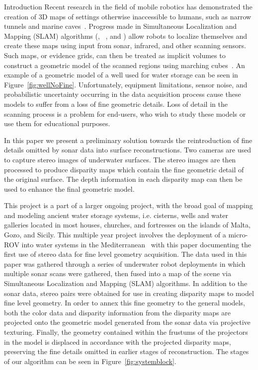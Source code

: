 \documentclass[twocolumn]{article}
\makeatletter
\def\section{\@startsection{section}{1}{\z@}{24pt plus 2 pt
minus 2 pt} {12pt plus 2pt minus 2pt}{\large\bf}}
\makeatother
\begin{document}
\section{Introduction}
Recent research in the field of mobile robotics has demonstrated the creation of 3D maps of settings otherwise inaccessible to humans, such as narrow tunnels and marine caves~\cite{ICEX11,McVicker,McVicker2}. Progress made in Simultaneous Localization and Mapping (SLAM) algorithms  (\cite{Williams2000}, ~\cite{harbor}, and \cite{Fairfield2005,Fairfield2006}) allow robots to localize themselves and create these maps using input from sonar, infrared, and other scanning sensors. Such maps, or evidence grids, can then be treated as implicit volumes to construct a geometric model of the scanned regions using marching cubes~\cite{Lorensen}. An example of a geometric model of a well used for water storage can be seen in Figure~\ref{fig:wellNoFine}. Unfortunately, equipment limitations, sensor noise, and probabilistic uncertainty occurring in the data acquisition process cause these models to suffer from a loss of fine geometric details. Loss of detail in the scanning process is a problem for end-users, who wish to study these models or use them for educational purposes.

In this paper we present a preliminary solution towards the reintroduction of fine details omitted by sonar data into surface reconstructions.
Two cameras are used to capture stereo images of underwater surfaces.
The stereo images are then processed to produce disparity maps which contain the fine geometric detail of the original surface.
The depth information in each disparity map can then be used to enhance the final geometric model.

This project is a part of a larger ongoing project, with the broad goal of mapping and modeling ancient water storage systems, i.e. cisterns, wells and water galleries located in most houses, churches, and fortresses on the islands of Malta, Gozo, and Sicily. This multiple year project involves the deployment of a micro-ROV into water systems in the Mediterranean~\cite{White10,ICEX11,McVicker,McVicker2} with this paper documenting the first use of stereo data for fine level geometry acquisition. The data used in this paper was gathered through a series of underwater robot deployments in which multiple sonar scans were gathered, then fused into a map of the scene via Simultaneous Localization and Mapping (SLAM) algorithms. In addition to the sonar data, stereo pairs were obtained for use in creating disparity maps to model fine level geometry. In order to annex this fine geometry to the general models, both the color data and disparity information from the disparity maps are projected onto the geometric model generated from the sonar data via projective texturing. Finally, the geometry contained within the frustums of the projectors in the model is displaced in accordance with the projected disparity maps, preserving the fine details omitted in earlier stages of reconstruction. The stages of our algorithm can be seen in Figure~\ref{fig:systemblock}.
\end{document}

